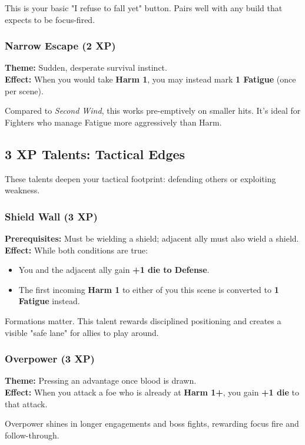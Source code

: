 \documentclass[11pt]{book}
\begin{document}
This is your basic "I refuse to fall yet" button.  
Pairs well with any build that expects to be focus-fired.

\subsubsection{Narrow Escape (2 XP)}
\textbf{Theme:} Sudden, desperate survival instinct.\\
\textbf{Effect:} When you would take \textbf{Harm 1}, you may instead mark
\textbf{1 Fatigue} (once per scene).

Compared to \emph{Second Wind}, this works pre-emptively on smaller hits.
It's ideal for Fighters who manage Fatigue more aggressively than Harm.

\subsection{3 XP Talents: Tactical Edges}

These talents deepen your tactical footprint: defending others or exploiting weakness.

\subsubsection{Shield Wall (3 XP)}
\textbf{Prerequisites:} Must be wielding a shield; adjacent ally must also wield a shield.\\
\textbf{Effect:} While both conditions are true:
\begin{itemize}
  \item You and the adjacent ally gain \textbf{+1 die to Defense}.
  \item The first incoming \textbf{Harm 1} to either of you this scene is converted to
        \textbf{1 Fatigue} instead.
\end{itemize}

Formations matter. This talent rewards disciplined positioning
and creates a visible "safe lane" for allies to play around.

\subsubsection{Overpower (3 XP)}
\textbf{Theme:} Pressing an advantage once blood is drawn.\\
\textbf{Effect:} When you attack a foe who is already at \textbf{Harm 1+},
you gain \textbf{+1 die} to that attack.

Overpower shines in longer engagements and boss fights,
rewarding focus fire and follow-through.
\end{document}
